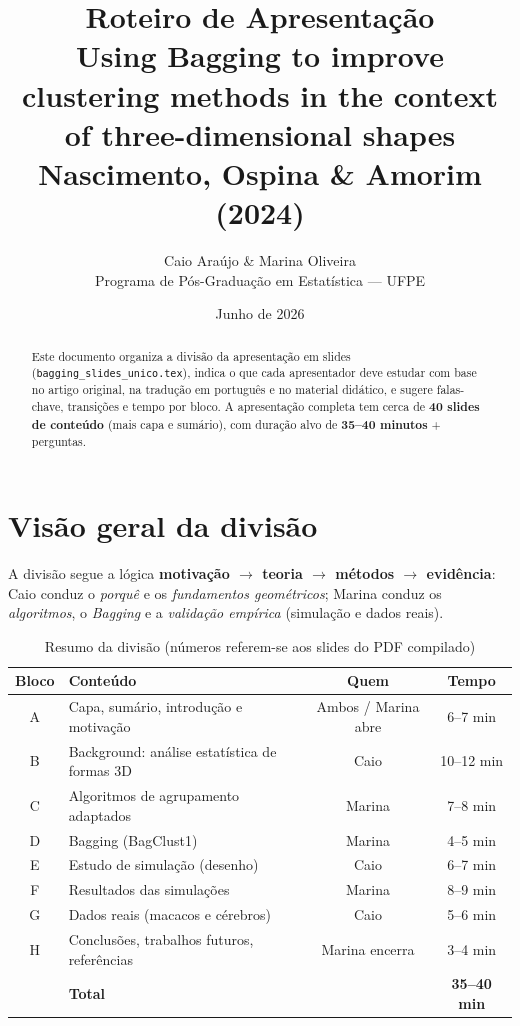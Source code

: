 \documentclass[12pt,a4paper]{article}
\title{\textbf{Roteiro de Apresentação}\\[0.2cm]
\large Using Bagging to improve clustering methods in the context of three-dimensional shapes\\[0.15cm]
\normalsize Nascimento, Ospina \& Amorim (2024)}
\author{Caio Araújo \& Marina Oliveira\\Programa de Pós-Graduação em Estatística --- UFPE}
\date{Junho de 2026}
\begin{document}
\maketitle

\begin{abstract}
\noindent
Este documento organiza a divisão da apresentação em slides
(\texttt{bagging\_slides\_unico.tex}), indica o que cada apresentador deve
estudar com base no artigo original, na tradução em português e no material
didático, e sugere falas-chave, transições e tempo por bloco.
A apresentação completa tem cerca de \textbf{40 slides de conteúdo}
(mais capa e sumário), com duração alvo de \textbf{35--40 minutos}
+ perguntas.
\end{abstract}

\tableofcontents
\newpage

\section{Visão geral da divisão}

A divisão segue a lógica \textbf{motivação $\rightarrow$ teoria $\rightarrow$ métodos $\rightarrow$ evidência}:
Caio conduz o \emph{porquê} e os \emph{fundamentos geométricos}; Marina conduz os
\emph{algoritmos}, o \emph{Bagging} e a \emph{validação empírica} (simulação e dados reais).

\begin{table}[h]
\centering
\caption{Resumo da divisão (números referem-se aos slides do PDF compilado)}
\begin{tabular}{@{}clcc@{}}
\toprule
\textbf{Bloco} & \textbf{Conteúdo} & \textbf{Quem} & \textbf{Tempo} \\
\midrule
A & Capa, sumário, introdução e motivação & Ambos / Marina abre & 6--7 min \\
B & Background: análise estatística de formas 3D & Caio & 10--12 min \\
C & Algoritmos de agrupamento adaptados & Marina & 7--8 min \\
D & Bagging (BagClust1) & Marina & 4--5 min \\
E & Estudo de simulação (desenho) & Caio & 6--7 min \\
F & Resultados das simulações & Marina & 8--9 min \\
G & Dados reais (macacos e cérebros) & Caio & 5--6 min \\
H & Conclusões, trabalhos futuros, referências & Marina encerra & 3--4 min \\
\midrule
 & \textbf{Total} & & \textbf{35--40 min} \\
\bottomrule
\end{tabular}
\end{table}
\end{document}
